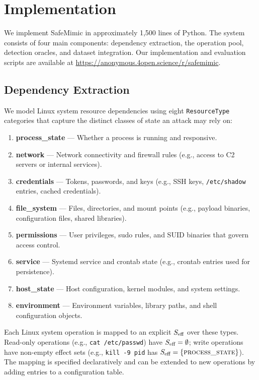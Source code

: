 \section{Implementation}
\label{sec:implementation}

We implement SafeMimic in approximately 1{,}500 lines of Python. The
system consists of four main components: dependency extraction, the
operation pool, detection oracles, and dataset integration. Our
implementation and evaluation scripts are available at
\url{https://anonymous.4open.science/r/safemimic}.

\subsection{Dependency Extraction}
\label{sec:dep_extraction}

We model Linux system resource dependencies using eight
\texttt{ResourceType} categories that capture the distinct classes of
state an attack may rely on:
\begin{enumerate}
  \item \textbf{process\_state} --- Whether a process is running and responsive.
  \item \textbf{network} --- Network connectivity and firewall rules (e.g.,
        access to C2 servers or internal services).
  \item \textbf{credentials} --- Tokens, passwords, and keys (e.g.,
        SSH keys, \texttt{/etc/shadow} entries, cached credentials).
  \item \textbf{file\_system} --- Files, directories, and mount points
        (e.g., payload binaries, configuration files, shared libraries).
  \item \textbf{permissions} --- User privileges, sudo rules, and SUID
        binaries that govern access control.
  \item \textbf{service} --- Systemd service and crontab state
        (e.g., crontab entries used for persistence).
  \item \textbf{host\_state} --- Host configuration, kernel modules, and
        system settings.
  \item \textbf{environment} --- Environment variables, library paths, and
        shell configuration objects.
\end{enumerate}
Each Linux system operation is mapped to an explicit $S_{\text{eff}}$ over
these types. Read-only operations (e.g., \texttt{cat /etc/passwd})
have $S_{\text{eff}} = \emptyset$; write operations have non-empty effect sets
(e.g., \texttt{kill -9 \textlangle pid\textrangle} has
$S_{\text{eff}} = \{\textsc{process\_state}\}$). The mapping is specified
declaratively and can be extended to new operations by adding entries to
a configuration table.

